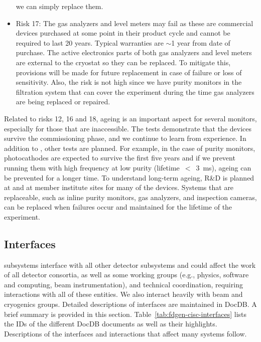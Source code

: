 \begin{itemize}
    we can simply replace them.
    \item Risk 17: The gas analyzers and level meters may fail as these are commercial devices purchased at some point in their product cycle and cannot be required to last 20 years. Typical warranties are $\sim$1 year from date of purchase. The active electronics parts of both gas analyzers and level meters are external to the cryostat so they can be replaced. To mitigate this, provisions will be made for future replacement in case of failure or loss of sensitivity. Also, the risk is not high since we have purity monitors in the filtration system that can cover the experiment during the time gas analyzers are being replaced or repaired. 
\end{itemize}

Related to risks 12, 16 and 18, ageing is an important aspect for several monitors, especially for those that are inaccessible. The  tests demonstrate that the devices survive the commissioning phase, and we continue to learn from  experience. In addition to , other tests are planned. For example, in the case of purity monitors, photocathodes are expected to survive the first five years and if we prevent running them with high frequency at low purity (lifetime~$<$~\SI{3}{\milli\second}), ageing can be prevented for a longer time. To understand long-term ageing, R\&D is planned at  and at member institute sites for many of the devices. %
Systems that are replaceable, such as inline purity monitors, gas analyzers, and inspection cameras, can be replaced when failures occur and maintained for the lifetime of the experiment.




\subsection{Interfaces}  
\label{sec:interfaces}

 subsystems interface with all other detector subsystems and could affect the work of all detector consortia, as well as some
working groups (e.g., physics, software and computing, beam instrumentation), and technical coordination, requiring interactions with all of these entities.  We also interact heavily with  beam and cryogenics groups.  
Detailed descriptions of  interfaces are maintained in  DocDB. A brief summary is provided in this section. Table~\ref{tab:fdgen-cisc-interfaces} lists the IDs of the different DocDB documents as well as their highlights. Descriptions of the interfaces and interactions that affect many systems follow. 

